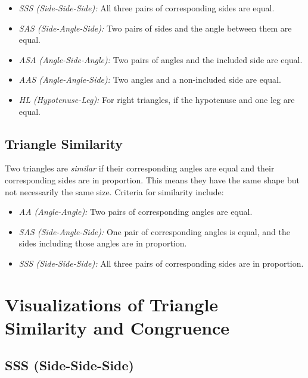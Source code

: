 \begin{itemize}

	\item \emph{SSS (Side-Side-Side):} All three pairs of corresponding sides are equal.

	\item \emph{SAS (Side-Angle-Side):} Two pairs of sides and the angle between them are equal.

	\item \emph{ASA (Angle-Side-Angle):} Two pairs of angles and the included side are equal.

	\item \emph{AAS (Angle-Angle-Side):} Two angles and a non-included side are equal.

	\item \emph{HL (Hypotenuse-Leg):} For right triangles, if the hypotenuse and one leg are equal.

\end{itemize}

\subsection{Triangle Similarity}
Two triangles are \emph{similar} if their corresponding angles are equal and their corresponding sides 
are in proportion. This means they have the same shape but not necessarily the same size. Criteria for 
similarity include:

\begin{itemize}

	\item \emph{AA (Angle-Angle):} Two pairs of corresponding angles are equal.

	\item \emph{SAS (Side-Angle-Side):} One pair of corresponding angles is equal, and the sides including 
	those angles are in proportion.

	\item \emph{SSS (Side-Side-Side):} All three pairs of corresponding sides are in proportion.

\end{itemize}

\section{Visualizations of Triangle Similarity and Congruence}

\subsection{SSS (Side-Side-Side)}

